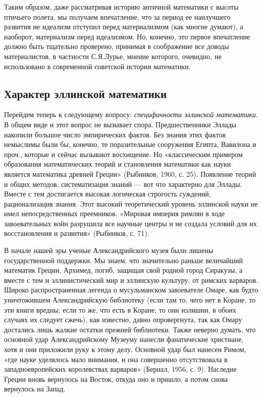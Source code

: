 Таким образом, даже рассматривая  историю античной математики с высоты
птичьего полета, мы получаем впечатление,  что за период ее наилучшего
развития не идеализм отступил перед материализмом (как многие думают),
а  наоборот, материализм  перед  идеализмом. Но,  конечно, это  первое
впечатление должно  быть тщательно  проверено, принимая  в соображение
все  доводы материалистов,  в  частности  С.Я.Лурье, мнение  которого,
очевидно, не использовано в современной советской истории математики.

\subsection{Характер эллинской математики}

Перейдем  теперь к  следующему вопросу:  \emph{специфичности эллинской
математики}.  В   общем  виде  и   этот  вопрос  не   вызывает  спора.
Предшественники Эллады накопили большое число эмпирических фактов. Без
знания  этих  фактов  немыслимы  были бы,  конечно,  те  поразительные
сооружения  Египта,  Вавилона  и  проч.,  которые  и  сейчас  вызывают
восхищение.  Но  «классическим   примером  образования  математических
теорий и становления математики  как науки является математика древней
Греции» (Рыбников,  1960, с.  25). Появление  теорий и  общих методов,
систематизация знаний --- вот что  характерно для Эллады. Вместе с тем
достигается  высокая  логическая  строгость  суждений,  рационализация
знания.  Этот   высокий  теоретический  уровень  эллинской   науки  не
имел  непосредственных  преемников.  «Мировая империя  римлян  в  ходе
завоевательных войн разрушила все научные  центры и не создала условий
для их восстановления и развития» (Рыбников, с. 71).

В  начале   нашей  эры  ученые  Александрийского   музея  были  лишены
государственной поддержки. Мы знаем, что значительно раньше величайший
математик Греции, Архимед, погиб,  защищая свой родной город Сиракузы,
а вместе с тем и эллинистический  мир и эллинскую культуру, от римских
варваров. Широко распространенная  легенда о мусульманском завоевателе
Омаре, как будто уничтожившем Александрийскую библиотеку (если там то,
чего нет в Коране, то эти книги вредны, если то же, что есть в Коране,
то они излишни, в обоих случаях их следует сжечь), как известно, давно
опровергнута,  так как  Омару  достались лишь  жалкие остатки  прежней
библиотеки. Также  неверно думать, что основной  удар Александрийскому
Музеуму нанесли  фанатические христиане, хотя  и они приложили  руку к
этому  делу. Основной  удар был  нанесен Римом,  «где науке  уделялось
мало  внимания, и  она совершенно  отсутствовала в  западноевропейских
королевствах  варваров» (Бернал,  1956, с.  9). Наследие  Греции вновь
вернулось на Восток,  откуда оно и пришло, а потом  снова вернулось на
Запад.

